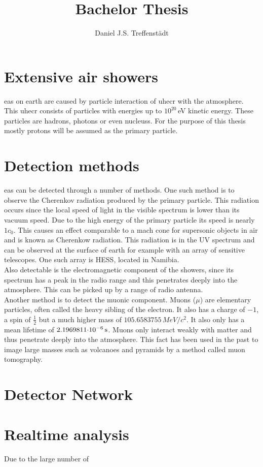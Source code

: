 \documentclass[abstract,toc,english,glossary]{jluthesis}
\title[Bachlor Thesis]{Bachelor Thesis}
\author[Daniel Treffenstädt]{Daniel J.S. Treffenstädt}
\begin{document}

\section{Extensive air showers}
\acrfull{eas} on earth are caused by particle interaction of \acrfull{uhecr} with the atmosphere. This \acrshort{uhecr} consists of particles with energies up to $10^{20}$\,eV kinetic energy. These particles are \glspl{hadron}, photons or even \glspl{nucleus}. For the purpose of this thesis mostly protons will be assumed as the primary particle.

\section{Detection methods}

\acrshort{eas} can be detected through a number of methods. One such method is to observe the Cherenkov radiation produced by the primary particle. This radiation occurs since the local speed of light in the visible spectrum is lower than its vacuum speed. Due to the high energy of the primary particle its speed is nearly $1c_0$. This causes an effect comparable to a mach cone for supersonic objects in air and is known as Cherenkow radiation. This radiation is in the UV spectrum and can be observed at the surface of earth for example with an array of sensitive telescopes. One such array is HESS, located in Namibia. \\
Also detectable is the electromagnetic component of the showers, since its spectrum has a peak in the radio range and this penetrates deeply into the atmosphere. This can be picked up by a range of radio antenna. \\
Another method is to detect the muonic component. Muons ($\mu$) are elementary particles, often called the heavy sibling of the electron. It also has a charge of $-1$, a spin of $\frac{1}{2}$ but a much higher mass of
$105.6583755\,\si{MeV/c^2}$. It also only has a mean lifetime of $\snsi{2.1969811}{-6}{s}$. Muons only interact weakly with matter and thus penetrate deeply into the atmosphere. This fact has been used in the past to image large masses such as volcanoes and pyramids by a method called muon tomography.

\section{Detector Network}

\section{Realtime analysis}
Due to the large number of 

\backmatter
\end{document}
